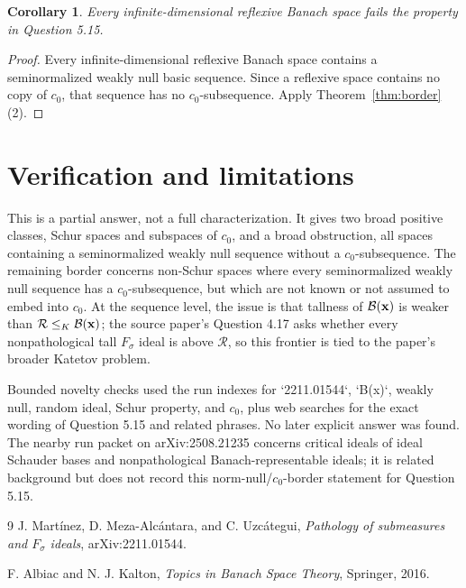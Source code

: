 \documentclass[11pt]{article}
\newtheorem{corollary}{Corollary}
\newcommand{\Rideal}{\mathcal R}
\newcommand{\Bideal}{\mathcal B}
\begin{document}
\begin{corollary}
Every infinite-dimensional reflexive Banach space fails the property in Question 5.15.
\end{corollary}

\begin{proof}
Every infinite-dimensional reflexive Banach space contains a seminormalized weakly null basic sequence.  Since a reflexive space contains no copy of \(c_0\), that sequence has no \(c_0\)-subsequence.  Apply Theorem~\ref{thm:border}(2).
\end{proof}

\section*{Verification and limitations}

This is a partial answer, not a full characterization.  It gives two broad positive classes, Schur spaces and subspaces of \(c_0\), and a broad obstruction, all spaces containing a seminormalized weakly null sequence without a \(c_0\)-subsequence.  The remaining border concerns non-Schur spaces where every seminormalized weakly null sequence has a \(c_0\)-subsequence, but which are not known or not assumed to embed into \(c_0\).  At the sequence level, the issue is that tallness of \(\Bideal({\bf x})\) is weaker than \(\Rideal\le_K\Bideal({\bf x})\); the source paper's Question 4.17 asks whether every nonpathological tall \(F_\sigma\) ideal is above \(\Rideal\), so this frontier is tied to the paper's broader Katetov problem.

Bounded novelty checks used the run indexes for `2211.01544`, `B(x)`, weakly null, random ideal, Schur property, and \(c_0\), plus web searches for the exact wording of Question 5.15 and related phrases.  No later explicit answer was found.  The nearby run packet on arXiv:2508.21235 concerns critical ideals of ideal Schauder bases and nonpathological Banach-representable ideals; it is related background but does not record this norm-null/\(c_0\)-border statement for Question 5.15.

\begin{thebibliography}{9}
J. Martínez, D. Meza-Alcántara, and C. Uzcátegui, \emph{Pathology of submeasures and \(F_\sigma\) ideals}, arXiv:2211.01544.

F. Albiac and N. J. Kalton, \emph{Topics in Banach Space Theory}, Springer, 2016.
\end{thebibliography}
\end{document}
